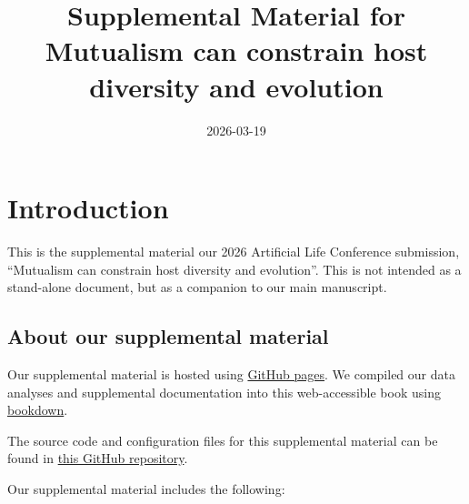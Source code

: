 \documentclass[
]{book}
\title{Supplemental Material for Mutualism can constrain host diversity and evolution}
\author{}
\date{\vspace{-2.5em}2026-03-19}
\begin{document}
\maketitle

{
\setcounter{tocdepth}{1}
\tableofcontents
}
\hypertarget{introduction}{%
\chapter{Introduction}\label{introduction}}

This is the supplemental material our 2026 Artificial Life Conference submission, ``Mutualism can constrain host diversity and evolution''.
This is not intended as a stand-alone document, but as a companion to our main manuscript.

\hypertarget{about-our-supplemental-material}{%
\section{About our supplemental material}\label{about-our-supplemental-material}}

Our supplemental material is hosted using \href{https://pages.github.com/}{GitHub pages}.
We compiled our data analyses and supplemental documentation into this web-accessible book using \href{https://bookdown.org}{bookdown}.

The source code and configuration files for this supplemental material can be found in \href{https://github.com/amlalejini/2026-alife-mutualism-constrains-evolution}{this GitHub repository}.

Our supplemental material includes the following:
\end{document}
